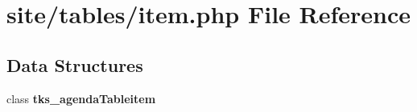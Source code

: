 \section{site/tables/item.php File Reference}
\label{site_2tables_2item_8php}
\subsection*{Data Structures}
\begin{DoxyCompactItemize}
\item 
class \textbf{ tks\+\_\+agenda\+Tableitem}
\end{DoxyCompactItemize}
